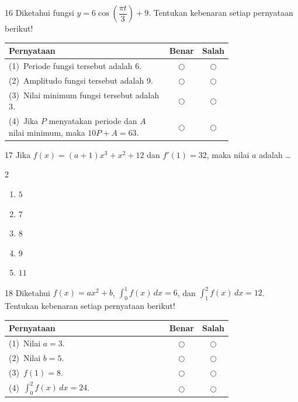 \documentclass[11pt]{article}
\newenvironment{pilB}{%
  \par\smallskip\begin{multicols}{2}
  \begin{enumerate}[label=(\Alph*),leftmargin=*,itemsep=1pt,topsep=3pt]}%
  {\end{enumerate}\end{multicols}}
\begin{document}
\begin{soal}{16}
Diketahui fungsi $y=6\cos\!\left(\dfrac{\pi t}{3}\right)+9$.
Tentukan kebenaran setiap pernyataan berikut!

\par\smallskip
{\renewcommand{\arraystretch}{1.4}%
\begin{tabular}{@{}p{0.76\linewidth}cc@{}}
\hline
\textbf{Pernyataan} & \textbf{Benar} & \textbf{Salah}\\
\hline
(1)~Periode fungsi tersebut adalah 6.
  & $\bigcirc$ & $\bigcirc$\\
(2)~Amplitudo fungsi tersebut adalah 9.
  & $\bigcirc$ & $\bigcirc$\\
(3)~Nilai minimum fungsi tersebut adalah 3.
  & $\bigcirc$ & $\bigcirc$\\
(4)~Jika $P$ menyatakan periode dan $A$ nilai minimum, maka $10P+A=63$.
  & $\bigcirc$ & $\bigcirc$\\
\hline
\end{tabular}}
\end{soal}

\begin{soal}{17}
Jika $f(x)=(a+1)x^3+x^2+12$ dan $f'(1)=32$,
maka nilai $a$ adalah \ldots
\begin{pilB}
  \item $5$ \item $7$ \item $8$ \item $9$ \item $11$
\end{pilB}
\end{soal}

\begin{soal}{18}
Diketahui $f(x)=ax^2+b$,\;
$\displaystyle\int_0^1 f(x)\,dx=6$,\;
dan $\displaystyle\int_1^2 f(x)\,dx=12$.
Tentukan kebenaran setiap pernyataan berikut!

\par\smallskip
{\renewcommand{\arraystretch}{1.4}%
\begin{tabular}{@{}p{0.76\linewidth}cc@{}}
\hline
\textbf{Pernyataan} & \textbf{Benar} & \textbf{Salah}\\
\hline
(1)~Nilai $a=3$.
  & $\bigcirc$ & $\bigcirc$\\
(2)~Nilai $b=5$.
  & $\bigcirc$ & $\bigcirc$\\
(3)~$f(1)=8$.
  & $\bigcirc$ & $\bigcirc$\\
(4)~$\displaystyle\int_0^2 f(x)\,dx=24$.
  & $\bigcirc$ & $\bigcirc$\\
\hline
\end{tabular}}
\end{soal}
\end{document}
